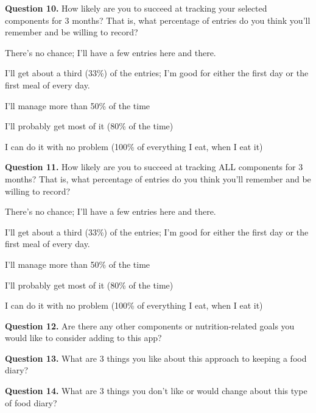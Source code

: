 \noindent\textbf{Question 10.}
How likely are you to succeed at tracking your selected components for 3 months? That is, what percentage of entries do you think you'll remember and be willing to record? 

\begin{itemize*}
\item	There's no chance; I'll have a few entries here and there.
\item	I'll get about a third (33\%) of the entries; I'm good for either the first day or the first meal of every day.
\item	I'll manage more than 50\% of the time
\item	I'll probably get most of it (80\% of the time)
\item	I can do it with no problem (100\% of everything I eat, when I eat it)
\end{itemize*}

\noindent\textbf{Question 11.}
How likely are you to succeed at tracking ALL components for 3 months? That is, what percentage of entries do you think you'll remember and be willing to record? 

\begin{itemize*}
\item	There's no chance; I'll have a few entries here and there.
\item	I'll get about a third (33\%) of the entries; I'm good for either the first day or the first meal of every day.
\item	I'll manage more than 50\% of the time
\item	I'll probably get most of it (80\% of the time)
\item	I can do it with no problem (100\% of everything I eat, when I eat it)
\end{itemize*}

\noindent\textbf{Question 12.}
Are there any other components or nutrition-related goals you would like to consider adding to this app?  


\noindent\textbf{Question 13.}
What are 3 things you like about this approach to keeping a food diary?  


\noindent\textbf{Question 14.}
What are 3 things you don't like or would change about this type of food diary?  

